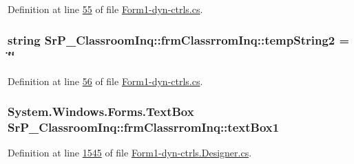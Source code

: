 \-Definition at line \hyperlink{_form1-dyn-ctrls_8cs_source_l00055}{55} of file \hyperlink{_form1-dyn-ctrls_8cs_source}{\-Form1-\/dyn-\/ctrls.\-cs}.

\hypertarget{class_sr_p___classroom_inq_1_1frm_classrrom_inq_a4ebaa0f6e4e9f61300c6aae855fc8fc1}{
\subsubsection[{temp\-String2}]{\setlength{\rightskip}{0pt plus 5cm}string {\bf \-Sr\-P\-\_\-\-Classroom\-Inq\-::frm\-Classrrom\-Inq\-::temp\-String2} = \char`\"{}\char`\"{}}}
\label{class_sr_p___classroom_inq_1_1frm_classrrom_inq_a4ebaa0f6e4e9f61300c6aae855fc8fc1}


\-Definition at line \hyperlink{_form1-dyn-ctrls_8cs_source_l00056}{56} of file \hyperlink{_form1-dyn-ctrls_8cs_source}{\-Form1-\/dyn-\/ctrls.\-cs}.

\hypertarget{class_sr_p___classroom_inq_1_1frm_classrrom_inq_a3ee11679c61cc3228121b7fe4f51d0c8}{
\subsubsection[{text\-Box1}]{\setlength{\rightskip}{0pt plus 5cm}\-System.\-Windows.\-Forms.\-Text\-Box {\bf \-Sr\-P\-\_\-\-Classroom\-Inq\-::frm\-Classrrom\-Inq\-::text\-Box1}}}
\label{class_sr_p___classroom_inq_1_1frm_classrrom_inq_a3ee11679c61cc3228121b7fe4f51d0c8}


\-Definition at line \hyperlink{_form1-dyn-ctrls_8_designer_8cs_source_l01545}{1545} of file \hyperlink{_form1-dyn-ctrls_8_designer_8cs_source}{\-Form1-\/dyn-\/ctrls.\-Designer.\-cs}.


